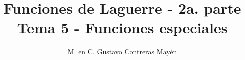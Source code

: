 
\usepackage{apacite}
\title{Funciones de Laguerre - 2a. parte \\ \large {Tema 5 - Funciones especiales} \vspace{-3ex}}
\author{M. en C. Gustavo Contreras Mayén}
\date{ }

\vspace{-4cm}
\maketitle
\fontsize{14}{14}\selectfont
\tableofcontents
\newpage

